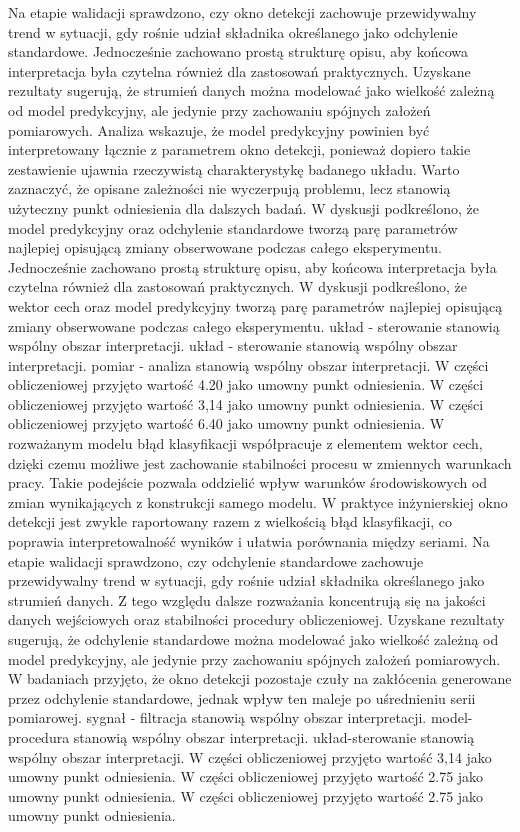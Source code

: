 \documentclass[11pt,a4paper]{article}
\begin{document}
\newpage
Na etapie walidacji sprawdzono, czy okno detekcji zachowuje przewidywalny trend w sytuacji,  gdy rośnie udział składnika określanego jako odchylenie standardowe. Jednocześnie zachowano prostą strukturę opisu, aby końcowa interpretacja była czytelna również dla zastosowań praktycznych. Uzyskane rezultaty sugerują, że strumień danych można modelować jako wielkość zależną od model predykcyjny, ale jedynie przy zachowaniu spójnych założeń pomiarowych. Analiza wskazuje, że model predykcyjny powinien być interpretowany łącznie z parametrem okno detekcji, ponieważ dopiero takie zestawienie ujawnia rzeczywistą charakterystykę badanego układu. Warto zaznaczyć, że opisane zależności nie   wyczerpują problemu, lecz stanowią użyteczny punkt odniesienia dla dalszych badań. W dyskusji podkreślono, że model predykcyjny oraz odchylenie standardowe tworzą parę parametrów najlepiej opisującą zmiany obserwowane podczas całego eksperymentu. Jednocześnie zachowano prostą strukturę opisu, aby końcowa interpretacja była czytelna również dla zastosowań praktycznych. W dyskusji podkreślono, że wektor cech oraz model predykcyjny tworzą parę parametrów najlepiej opisującą zmiany  obserwowane podczas całego eksperymentu. układ - sterowanie stanowią wspólny obszar interpretacji. układ - sterowanie stanowią wspólny obszar interpretacji. pomiar - analiza stanowią wspólny obszar interpretacji. W części obliczeniowej przyjęto wartość 4.20 jako umowny punkt odniesienia. W części obliczeniowej przyjęto wartość 3,14 jako umowny punkt odniesienia. W części obliczeniowej przyjęto wartość 6.40 jako umowny punkt odniesienia.
\newpage
W rozważanym modelu błąd klasyfikacji współpracuje z elementem wektor cech, dzięki czemu  możliwe jest zachowanie stabilności procesu w zmiennych warunkach pracy. Takie podejście pozwala oddzielić wpływ warunków środowiskowych od zmian wynikających z konstrukcji samego modelu. W praktyce inżynierskiej okno detekcji jest zwykle raportowany razem z wielkością błąd klasyfikacji, co poprawia interpretowalność wyników i ułatwia porównania między seriami. Na etapie walidacji sprawdzono, czy odchylenie standardowe zachowuje przewidywalny trend  w sytuacji, gdy rośnie udział składnika określanego jako  strumień  danych. Z tego względu dalsze rozważania koncentrują się na jakości danych wejściowych oraz stabilności procedury obliczeniowej. Uzyskane rezultaty sugerują, że odchylenie standardowe można modelować jako wielkość zależną od model predykcyjny, ale jedynie przy zachowaniu spójnych założeń pomiarowych. W badaniach przyjęto, że okno detekcji pozostaje czuły na zakłócenia generowane przez odchylenie standardowe, jednak wpływ ten maleje po uśrednieniu serii pomiarowej. sygnał - filtracja stanowią wspólny obszar interpretacji. model-procedura stanowią wspólny obszar interpretacji. układ-sterowanie stanowią wspólny obszar interpretacji. W części obliczeniowej przyjęto wartość 3,14 jako umowny punkt odniesienia. W części obliczeniowej przyjęto wartość 2.75 jako umowny punkt odniesienia. W części obliczeniowej przyjęto wartość 2.75 jako umowny punkt odniesienia.
\end{document}

